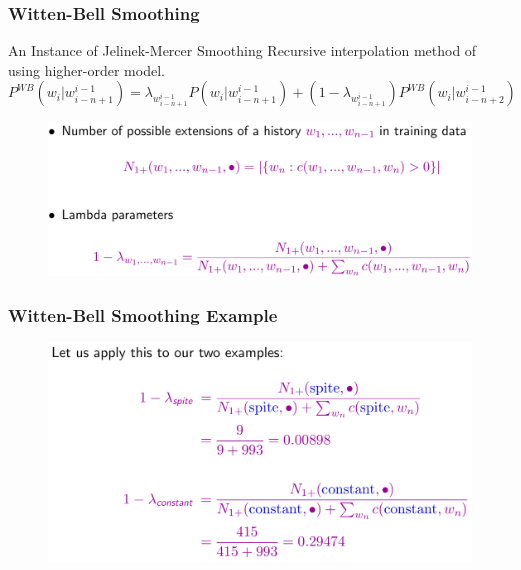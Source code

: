 \documentclass{beamer}
\begin{document}
\begin{frame}\frametitle{Witten-Bell Smoothing}

\begin{block}{An Instance of Jelinek-Mercer Smoothing}
Recursive interpolation method of using higher-order model.
$$
P^{WB}(w_i|w_{i-n+1}^{i-1}) =
\lambda_{w_{i-n+1}^{i-1}}P(w_i|w_{i-n+1}^{i-1}) + (1-\lambda_{w_{i-n+1}^{i-1}})P^{WB}(w_i|w_{i-n+2}^{i-1})
$$
\vspace{-10pt}
\begin{figure}
\includegraphics[width=1\linewidth]{figure/witten_bell_smoothing_equation.pdf}
\end{figure}
\end{block}
\end{frame}


\begin{frame}\frametitle{Witten-Bell Smoothing Example}

\begin{block}{}
\begin{figure}
\includegraphics[width=1\linewidth]{figure/witten_bell_exam.pdf}
\end{figure}
\end{block}
\end{frame}
\end{document}
